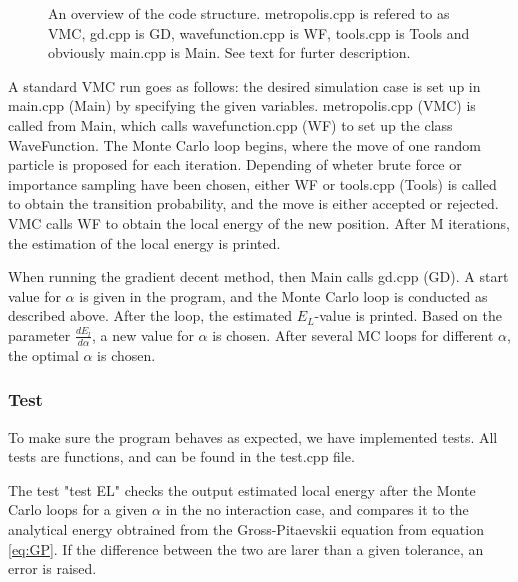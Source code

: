 \documentclass[norsk,a4paper,12pt]{article}
\begin{document}
\begin{figure}[H]
\centering
{}
\caption{An overview of the code structure. metropolis.cpp is refered to as VMC, gd.cpp is GD, wavefunction.cpp is WF, tools.cpp is Tools and obviously main.cpp is Main. See text for furter description.}
\label{fig:code_structure}
\end{figure}
 A standard VMC run goes as follows: the desired simulation case is set up in main.cpp (Main) by specifying the given variables. metropolis.cpp (VMC) is called from Main, which calls wavefunction.cpp (WF) to set up the class WaveFunction. The Monte Carlo loop begins, where the move of one random particle is proposed for each iteration. Depending of wheter brute force or importance sampling have been chosen, either WF or tools.cpp (Tools) is called to obtain the transition probability, and the move is either accepted or rejected. VMC calls WF to obtain the local energy of the new position. After M iterations, the estimation of the local energy is printed. \par
 When running the gradient decent method, then Main calls gd.cpp (GD). A start value for $\alpha$ is given in the program, and the Monte Carlo loop is conducted as described above. After the loop, the estimated $E_L$-value is printed. Based on the parameter $\frac{d E_l}{d \alpha}$, a new value for $\alpha$ is chosen. After several MC loops for different $\alpha$, the optimal $\alpha$ is chosen. 
 
 \subsubsection{Test}
To make sure the program behaves as expected, we have implemented tests. All tests are functions, and can be found in the test.cpp file.

The test "test EL" checks the output estimated local energy after the Monte Carlo loops for a given $\alpha$ in the no interaction case, and compares it to the analytical energy obtrained from the Gross-Pitaevskii equation from equation \ref{eq:GP}. If the difference between the two are larer than a given tolerance, an error is raised.
\end{document}
